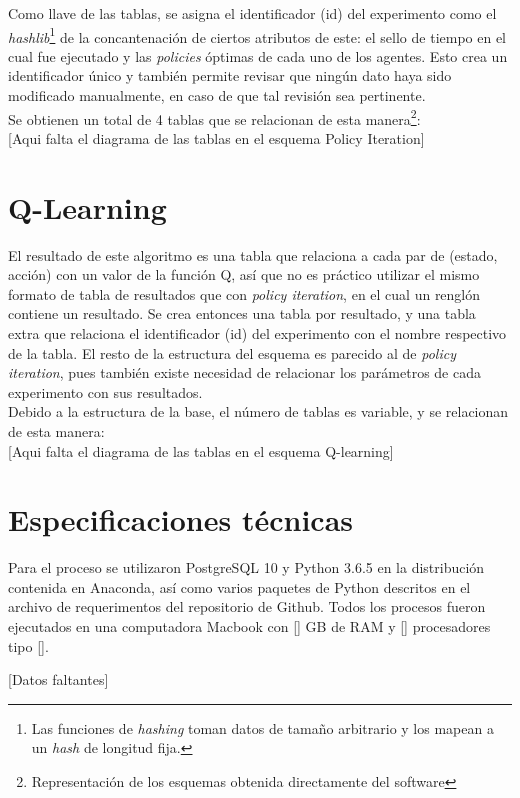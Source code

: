 Como llave de las tablas, se asigna el identificador (id) del experimento como el \textit{hashlib}\footnote{Las funciones de \textit{hashing} toman datos de tama\~no arbitrario y los mapean a un \textit{hash} de longitud fija.} de la concantenaci\'on de ciertos atributos de este: el sello de tiempo en el cual fue ejecutado y las \textit{policies} \'optimas de cada uno de los agentes. Esto crea un identificador \'unico y tambi\'en permite revisar que ning\'un dato haya sido modificado manualmente, en caso de que tal revisi\'on sea pertinente.\\

Se obtienen un total de 4 tablas que se relacionan de esta manera\footnote{Representaci\'on de los esquemas obtenida directamente del software }:\\

[Aqui falta el diagrama de las tablas en el esquema Policy Iteration]




\section{Q-Learning}

El resultado de este algoritmo es una tabla que relaciona a cada par de (estado, acci\'on) con un valor de la funci\'on Q, as\'i que no es pr\'actico utilizar el mismo formato de tabla de resultados que con \textit{policy iteration}, en el cual un rengl\'on contiene un resultado. Se crea entonces una tabla por resultado, y una tabla extra que relaciona el identificador (id) del experimento con el nombre respectivo de la tabla. El resto de la estructura del esquema es parecido al de \textit{policy iteration}, pues tambi\'en existe necesidad de relacionar los par\'ametros de cada experimento con sus resultados.\\

Debido a la estructura de la base, el n\'umero de tablas es variable, y se relacionan de esta manera:\\ 

[Aqui falta el diagrama de las tablas en el esquema Q-learning]

\section{Especificaciones t\'ecnicas}

Para el proceso se utilizaron PostgreSQL 10 y Python 3.6.5 en la distribuci\'on contenida en Anaconda, as\'i como varios paquetes de Python descritos en el archivo de requerimentos del repositorio de Github. Todos los procesos fueron ejecutados en una computadora Macbook con [] GB de RAM y [] procesadores tipo [].

[Datos faltantes]